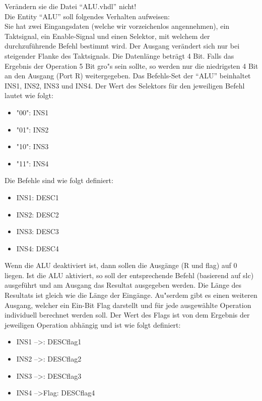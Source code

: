 \documentclass[a4paper,12pt]{article}
\begin{document}
Ver\"andern sie die Datei "`ALU.vhdl"' nicht!
\\

Die Entity "`ALU"' soll folgendes Verhalten aufweisen:\\
Sie hat zwei Eingangsdaten (welche wir vorzeichenlos angennehmen), ein Taktsignal, ein Enable-Signal und einen Selektor, mit welchem der durchzuf\"uhrende Befehl bestimmt wird.
Der Ausgang ver\"andert sich nur bei steigender Flanke des Taktsignals. Die Datenl\"ange betr\"agt 4 Bit. Falls das Ergebnis der Operation 5 Bit gro"s sein sollte, so werden nur die niedrigsten 4 Bit an den Ausgang (Port R) weitergegeben. Das Befehls-Set der "`ALU"' beinhaltet {{INS1}}, {{INS2}}, {{INS3}} und {{INS4}}. Der Wert des Selektors f\"ur den jeweiligen Befehl lautet wie folgt:
\\

\begin{itemize}
\item "00": {{INS1}}
\item "01": {{INS2}}
\item "10": {{INS3}}
\item "11": {{INS4}}
\end{itemize}
\vspace{0.3cm}

Die Befehle sind wie folgt definiert:
\begin{itemize}
\item {{INS1}}: {{DESC1}}
\item {{INS2}}: {{DESC2}}
\item {{INS3}}: {{DESC3}}
\item {{INS4}}: {{DESC4}}
\end{itemize}
\vspace{0.3cm}

Wenn die ALU deaktiviert ist, dann sollen die Ausg\"ange (R und flag) auf 0 liegen. Ist die ALU aktiviert, so soll der entsprechende Befehl (basierend auf slc) ausgef\"uhrt und am Ausgang das Resultat ausgegeben werden. Die L\"ange des Resultats ist gleich wie die L\"ange der Eing\"ange. Au"serdem gibt es einen weiteren Ausgang, welcher ein Ein-Bit Flag darstellt und f\"ur jede ausgew\"ahlte Operation individuell berechnet werden soll. Der Wert des Flags ist von dem Ergebnis der jeweiligen Operation abh\"angig und ist wie folgt definiert:
\\
\begin{itemize}
\item {{INS1}} --\textgreater {}: {{DESCflag1}}
\item {{INS2}} --\textgreater {}: {{DESCflag2}}
\item {{INS3}} --\textgreater {}: {{DESCflag3}}
\item {{INS4}} --\textgreater \enspace Flag: {{DESCflag4}}
\end{itemize}
\vspace{0.3cm}
\end{document}
